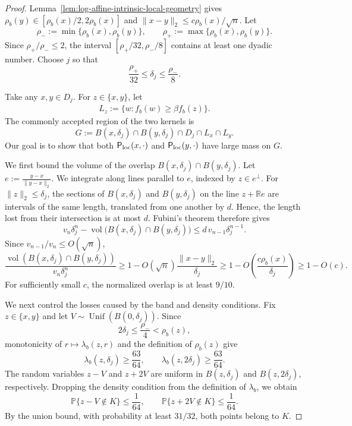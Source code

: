 \documentclass[11pt]{article}
\theoremstyle{definition}
\theoremstyle{remark}
\newcommand{\Prb}{\mathbb P}
\newcommand{\R}{\mathbb R}
\newcommand{\vol}{\operatorname{vol}}
\newcommand{\Unif}{\operatorname{Unif}}
\begin{document}
\begin{proof}
Lemma~\ref{lem:log-affine-intrinsic-local-geometry} gives
$\rho_b(y)\in[\rho_b(x)/2,2\rho_b(x)]$ and
$\|x-y\|_2\le c\rho_b(x)/\sqrt n$.  Let
\[
 \rho_-:=\min\{\rho_b(x),\rho_b(y)\},
 \qquad
 \rho_+:=\max\{\rho_b(x),\rho_b(y)\}.
\]
Since $\rho_+/\rho_-\le2$, the interval
$[\rho_+/32,\rho_-/8]$ contains at least one dyadic number.  Choose $j$ so that
\begin{equation}\label{eq:log-affine-overlap-scale}
 \frac{\rho_+}{32}\le\delta_j\le\frac{\rho_-}{8}.
\end{equation}

Take any $x,y\in D_j$.  For $z\in \{x,y\}$, let 
\begin{align*}
    L_z:=\{w:f_b(w)\ge\beta f_b(z)\}.
\end{align*}
The commonly accepted region of the two kernels is
\[
 G:=B(x,\delta_j)\cap B(y,\delta_j)\cap D_j\cap L_x\cap L_y.
\]
Our goal is to show that both ${\sf P}_{\rm loc}(x,\cdot)$ and ${\sf P}_{\rm loc}(y,\cdot)$ have large mass on $G$.

We first bound the volume of the overlap $B(x,\delta_j)\cap B(y,\delta_j)$. Let $e:=\frac{y-x}{\|y-x\|_2}$.  We integrate along lines parallel to $e$, indexed by $z\in e^\perp$.  For $\|z\|_2\le\delta_j$, the sections of $B(x,\delta_j)$ and $B(y,\delta_j)$ on the line $z+\R e$ are intervals of the same length, translated from one another by $d$.  Hence, the length lost from their intersection is at most $d$.  Fubini's theorem
therefore gives
\[
 v_n\delta_j^n
 -\vol\bigl(B(x,\delta_j)\cap B(y,\delta_j)\bigr)\le
 d\,v_{n-1}\delta_j^{n-1}.
\]
Since $v_{n-1}/v_n\leq O(\sqrt n)$,
\[
 \frac{\vol(B(x,\delta_j)\cap B(y,\delta_j))}
 {v_n\delta_j^n}
 \ge
 1-O(\sqrt n)\frac{\|x-y\|_2}{\delta_j}\geq 1-O\left(\frac{c\rho_b(x)}{\delta_j}\right)\geq 1-O(c).
\]
For sufficiently small $c$, the normalized overlap is at least $9/10$.

We next control the losses caused by the band and density conditions. Fix $z\in\{x,y\}$ and let $V\sim\Unif(B(0,\delta_j))$.  Since
\[
 2\delta_j
 \le\frac{\rho_-}{4}
 <\rho_b(z),
\]
monotonicity of
$r\mapsto\lambda_b(z,r)$ and the definition of $\rho_b(z)$ give
\[
 \lambda_b(z,\delta_j)\ge \frac{63}{64},
 \qquad
 \lambda_b(z,2\delta_j)\ge\frac{63}{64}.
\]
The random variables $z-V$ and $z+2V$ are uniform in
$B(z,\delta_j)$ and $B(z,2\delta_j)$, respectively.  Dropping the
density condition from the definition of $\lambda_b$, we obtain
\[
 \Prb\{z-V\notin K\}\le \frac{1}{64},
 \qquad
 \Prb\{z+2V\notin K\}\le \frac{1}{64}.
\]
By the union bound, with probability at least $31/32$, both points belong to $K$.


\end{proof}
\end{document}
